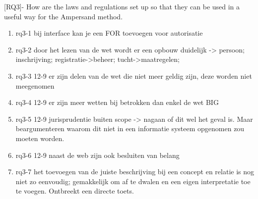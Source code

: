 [RQ3]- How are the laws and regulations set up so that they can be used in a useful way for the Ampersand method.
\begin{enumerate}
    \item rq3-1 bij interface kan je een FOR toevoegen voor autorisatie
    \item rq3-2 door het lezen van de wet wordt er een opbouw duidelijk -> persoon; inschrijving; registratie->beheer; tucht->maatregelen; 
    \item rq3-3 12-9 er zijn delen van de wet die niet meer geldig zijn, deze worden niet meegenomen
    \item rq3-4 12-9 er zijn meer wetten bij betrokken dan enkel de wet BIG
    \item rq3-5 12-9 jurisprudentie buiten scope -> nagaan of dit wel het geval is. Maar beargumenteren waarom dit niet in een informatie systeem opgenomen zou moeten worden.
    \item rq3-6 12-9 naast de web zijn ook besluiten van belang
    \item rq3-7 het toevoegen van de juiste beschrijving bij een concept en relatie is nog niet zo eenvoudig; gemakkelijk om af te dwalen en een eigen interpretatie toe te voegen. Ontbreekt een directe toets.
\end{enumerate}